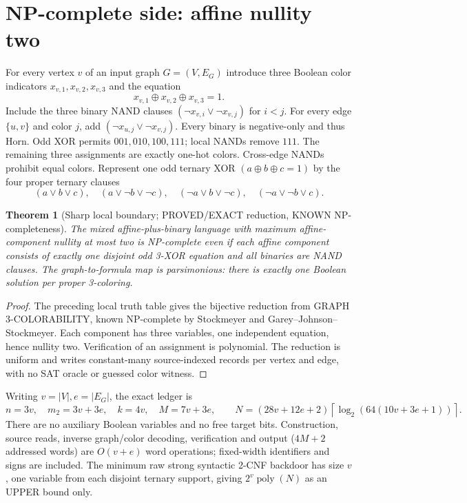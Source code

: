 \documentclass[11pt]{article}
\newtheorem{theorem}{Theorem}
\newcommand{\poly}{\operatorname{poly}}
\begin{document}
\section{NP-complete side: affine nullity two}
For every vertex $v$ of an input graph $G=(V,E_G)$ introduce three Boolean color indicators $x_{v,1},x_{v,2},x_{v,3}$ and the equation
\[x_{v,1}\oplus x_{v,2}\oplus x_{v,3}=1.\]
Include the three binary NAND clauses $(\neg x_{v,i}\vee\neg x_{v,j})$ for $i<j$. For every edge $\{u,v\}$ and color $j$, add $(\neg x_{u,j}\vee\neg x_{v,j})$. Every binary is negative-only and thus Horn. Odd XOR permits $001,010,100,111$; local NANDs remove $111$. The remaining three assignments are exactly one-hot colors. Cross-edge NANDs prohibit equal colors.
Represent one odd ternary XOR $(a\oplus b\oplus c=1)$ by the four proper ternary clauses
\[
(a\vee b\vee c),\quad(a\vee\neg b\vee\neg c),\quad
(\neg a\vee b\vee\neg c),\quad(\neg a\vee\neg b\vee c).
\]
\begin{theorem}[Sharp local boundary; PROVED/EXACT reduction, KNOWN NP-completeness]
The mixed affine-plus-binary language with maximum affine-component nullity at most two is NP-complete even if each affine component consists of exactly one disjoint odd 3-XOR equation and all binaries are NAND clauses. The graph-to-formula map is parsimonious: there is exactly one Boolean solution per proper 3-coloring.
\end{theorem}
\begin{proof}
The preceding local truth table gives the bijective reduction from GRAPH 3-COLORABILITY, known NP-complete by Stockmeyer and Garey--Johnson--Stockmeyer. Each component has three variables, one independent equation, hence nullity two. Verification of an assignment is polynomial. The reduction is uniform and writes constant-many source-indexed records per vertex and edge, with no SAT oracle or guessed color witness.
\end{proof}
Writing $v=|V|,e=|E_G|$, the exact ledger is
\[
n=3v,\quad m_2=3v+3e,\quad k=4v,\quad M=7v+3e,\qquad
N=(28v+12e+2)\left\lceil\log_2(64(10v+3e+1))\right\rceil.
\]
There are no auxiliary Boolean variables and no free target bits. Construction, source reads, inverse graph/color decoding, verification and output ($4M+2$ addressed words) are $O(v+e)$ word operations; fixed-width identifiers and signs are included. The minimum raw strong syntactic 2-CNF backdoor has size $v$, one variable from each disjoint ternary support, giving $2^v\poly(N)$ as an UPPER bound only.
\end{document}

